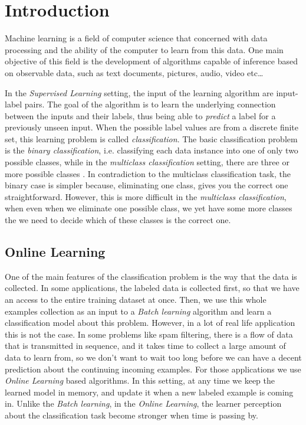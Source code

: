 \chapter{Introduction}


Machine learning is a  field of computer science that concerned with data processing and the ability
of the computer to learn from this data. 
One main objective of this field is the development of algorithms capable of inference based on 
observable data, such as text documents, pictures, audio, video etc\ldots 
 
In the \textit{Supervised Learning} setting, the input of the learning algorithm are input-label pairs. 
The goal of the algorithm is to learn the underlying connection between the inputs and their labels, 
thus being able to \textit{predict} a label for a previously unseen input. 
When the possible label values are from a discrete finite set, this learning problem is called
 \textit{classification}. The basic classification problem is the \textit{binary classification}, i.e. classifying 
 each data instance into one of only two possible classes, while in the \textit{multiclass classification} setting, 
 there are three or more possible classes . In contradiction to the multiclass classification task, the binary 
 case is simpler because, eliminating one class, gives you the correct one 
 straightforward. However, this is more difficult in the \textit{multiclass 
 classification}, when even when we eliminate one possible class, we yet have 
 some more classes the we need to decide which of these classes  is the correct one. 
 

\section{Online Learning}
\label{sec:online_learning}

One of the main features of the classification problem is the way that the data is collected. 
In some applications, the labeled data is collected first, so that we have an access to the entire training
 dataset at once. Then, we use this whole examples collection as an input to 
 a \textit{Batch learning} algorithm and learn a classification model about this problem. 
However, in a lot of real life application this is not the case. In some problems like spam filtering, there is
a flow of data that is transmitted in sequence, and it takes time to collect a large amount of data to learn
 from, so we don't want to wait too long before we can have a decent prediction about the continuing 
 incoming examples. For those applications we use  \textit{Online Learning} based algorithms. 
  In this setting, at any time we keep the learned model in memory, and update it when 
  a new labeled example is coming in.
Unlike the \textit{Batch learning}, in the \textit{Online Learning}, 
the learner perception about the classification task become stronger when time is passing by.
 
